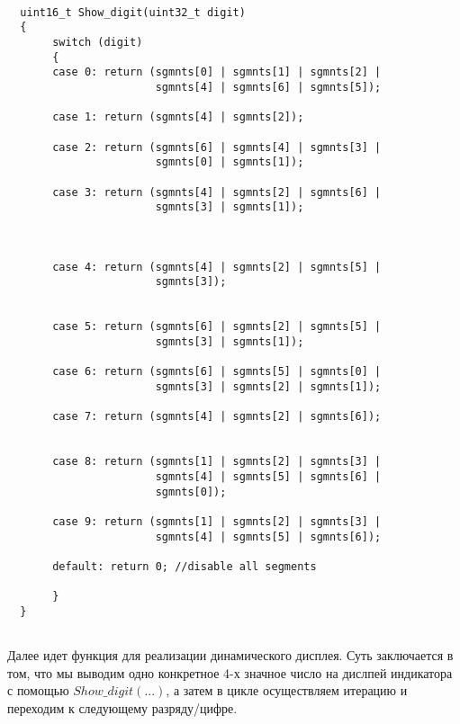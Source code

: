   \begin{verbatim}
      
  uint16_t Show_digit(uint32_t digit)
  {
       switch (digit)
       {
       case 0: return (sgmnts[0] | sgmnts[1] | sgmnts[2] |
                       sgmnts[4] | sgmnts[6] | sgmnts[5]);
               
       case 1: return (sgmnts[4] | sgmnts[2]);
       
       case 2: return (sgmnts[6] | sgmnts[4] | sgmnts[3] |
                       sgmnts[0] | sgmnts[1]);
               
       case 3: return (sgmnts[4] | sgmnts[2] | sgmnts[6] | 
                       sgmnts[3] | sgmnts[1]);
                       
       
    
       case 4: return (sgmnts[4] | sgmnts[2] | sgmnts[5] | 
                       sgmnts[3]);
               
               
       case 5: return (sgmnts[6] | sgmnts[2] | sgmnts[5] | 
                       sgmnts[3] | sgmnts[1]);
               
       case 6: return (sgmnts[6] | sgmnts[5] | sgmnts[0] |
                       sgmnts[3] | sgmnts[2] | sgmnts[1]);
               
       case 7: return (sgmnts[4] | sgmnts[2] | sgmnts[6]);
                       
               
       case 8: return (sgmnts[1] | sgmnts[2] | sgmnts[3] |
                       sgmnts[4] | sgmnts[5] | sgmnts[6] |
                       sgmnts[0]);
         
       case 9: return (sgmnts[1] | sgmnts[2] | sgmnts[3] |
                       sgmnts[4] | sgmnts[5] | sgmnts[6]);
               
       default: return 0; //disable all segments 
            
       }
  }
  
  \end{verbatim}
  
  Далее идет функция для реализации динамического дисплея. Суть заключается в том, что мы выводим одно конкретное 4-х значное число на дислпей индикатора с помощью $Show\_digit(...)$, а затем в цикле осуществляем итерацию и переходим к следующему разряду/цифре.
  
